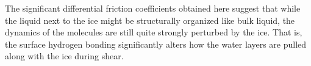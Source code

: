 
The significant differential friction coefficients obtained here
suggest that while the liquid next to the ice might be structurally
organized like bulk liquid, the dynamics of the molecules are still
quite strongly perturbed by the ice.  That is, the surface hydrogen
bonding significantly alters how the water layers are pulled along
with the ice during shear.


